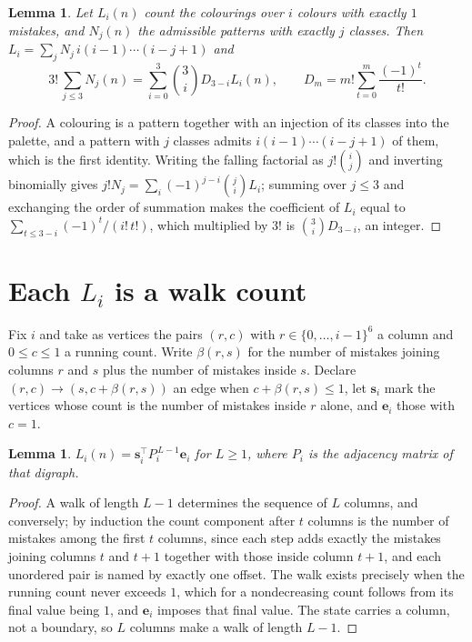 \documentclass[11pt,a4paper]{article}
\theoremstyle{plain}
\newtheorem{lemma}[theorem]{Lemma}
\theoremstyle{definition}
\begin{document}
\begin{lemma}\label{lem:inv}
Let $L_i(n)$ count the colourings over $i$ colours with exactly $1$ mistakes, and $N_j(n)$
the admissible patterns with exactly $j$ classes. Then
$L_i=\sum_j N_j\,i(i-1)\cdots(i-j+1)$ and
\[
3!\,\sum_{j\le3}N_j(n)=\sum_{i=0}^{3}\binom{3}{i}D_{3-i}L_i(n),
\qquad D_m=m!\sum_{t=0}^{m}\frac{(-1)^t}{t!} .
\]
\end{lemma}

\begin{proof}
A colouring is a pattern together with an injection of its classes into the palette, and a
pattern with $j$ classes admits $i(i-1)\cdots(i-j+1)$ of them, which is the first identity.
Writing the falling factorial as $j!\binom{i}{j}$ and inverting binomially gives
$j!N_j=\sum_i(-1)^{j-i}\binom{j}{i}L_i$; summing over $j\le3$ and exchanging the order
of summation makes the coefficient of $L_i$ equal to $\sum_{t\le3-i}(-1)^t/(i!\,t!)$,
which multiplied by $3!$ is $\binom{3}{i}D_{3-i}$, an integer.
\end{proof}

\section{Each $L_i$ is a walk count}

Fix $i$ and take as vertices the pairs $(r,c)$ with $r\in\{0,\dots,i-1\}^{6}$ a column
and $0\le c\le1$ a running count. Write $\beta(r,s)$ for the number of mistakes joining
columns $r$ and $s$ plus the number of mistakes inside $s$. Declare $(r,c)\to(s,c+\beta(r,s))$
an edge when $c+\beta(r,s)\le1$, let $\mathbf{s}_i$ mark the vertices whose count is the
number of mistakes inside $r$ alone, and $\mathbf{e}_i$ those with $c=1$.

\begin{lemma}\label{lem:walk}
$L_i(n)=\mathbf{s}_i^{\!\top}P_i^{\,L-1}\mathbf{e}_i$ for $L\ge1$, where $P_i$ is the
adjacency matrix of that digraph.
\end{lemma}

\begin{proof}
A walk of length $L-1$ determines the sequence of $L$ columns, and conversely; by induction
the count component after $t$ columns is the number of mistakes among the first $t$ columns,
since each step adds exactly the mistakes joining columns $t$ and $t+1$ together with those
inside column $t+1$, and each unordered pair is named by exactly one offset. The walk exists
precisely when the running count never exceeds $1$, which for a nondecreasing count follows
from its final value being $1$, and $\mathbf{e}_i$ imposes that final value. The state
carries a column, not a boundary, so $L$ columns make a walk of length $L-1$.
\end{proof}
\end{document}
